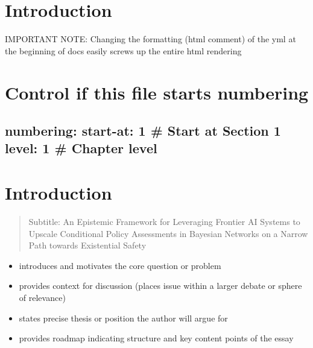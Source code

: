 \documentclass[
  11pt,
  letterpaper,
]{book}
\providecommand{\tightlist}{%
  \setlength{\itemsep}{0pt}\setlength{\parskip}{0pt}}
\begin{document}

\chapter{Introduction}\label{introduction}

IMPORTANT NOTE: Changing the formatting (html comment) of the yml at the
beginning of docs easily screws up the entire html rendering


\chapter{Control if this file starts
numbering}\label{control-if-this-file-starts-numbering}

\section{numbering: start-at: 1 \# Start at Section 1 level: 1 \#
Chapter
level}\label{numbering-start-at-1-start-at-section-1-level-1-chapter-level}


\chapter{Introduction}\label{sec-introduction}

\begin{quote}
Subtitle: An Epistemic Framework for Leveraging Frontier AI Systems to
Upscale Conditional Policy Assessments in Bayesian Networks on a Narrow
Path towards Existential Safety
\end{quote}

\begin{tcolorbox}[enhanced jigsaw, bottomrule=.15mm, title=\textcolor{quarto-callout-note-color}{\faInfo}\hspace{0.5em}{10\% of Grade: \textasciitilde{} 14\% of text \textasciitilde{} 4200
words \textasciitilde{} 10 pages}, opacityback=0, arc=.35mm, breakable, toptitle=1mm, toprule=.15mm, colframe=quarto-callout-note-color-frame, bottomtitle=1mm, rightrule=.15mm, opacitybacktitle=0.6, left=2mm, titlerule=0mm, leftrule=.75mm, colback=white, colbacktitle=quarto-callout-note-color!10!white, coltitle=black]

\begin{itemize}
\tightlist
\item
  introduces and motivates the core question or problem
\item
  provides context for discussion (places issue within a larger debate
  or sphere of relevance)
\item
  states precise thesis or position the author will argue for
\item
  provides roadmap indicating structure and key content points of the
  essay
\end{itemize}

\end{tcolorbox}
\end{document}
